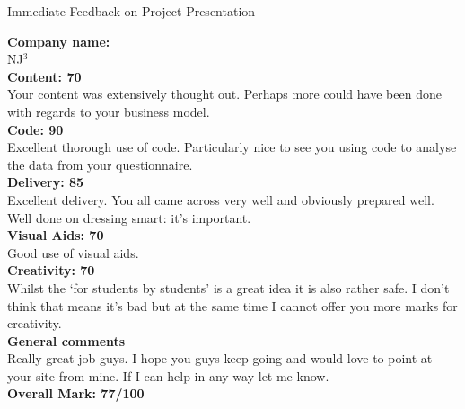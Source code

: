 \documentclass{article}
\begin{document}
\begin{center}
\Huge{Immediate Feedback on Project Presentation}\\
\end{center}


\normalsize
\textbf{Company name:}\\

NJ$^3$ \\

\textbf{Content: 70}\\

Your content was extensively thought out.
Perhaps more could have been done with regards to your business model.\\

\textbf{Code: 90}\\

Excellent thorough use of code.
Particularly nice to see you using code to analyse the data from your questionnaire.\\

\textbf{Delivery: 85}\\

Excellent delivery.
You all came across very well and obviously prepared well.
Well done on dressing smart: it's important.\\

\textbf{Visual Aids: 70}\\

Good use of visual aids.\\

\textbf{Creativity: 70}\\

Whilst the `for students by students' is a great idea it is also rather safe.
I don't think that means it's bad but at the same time I cannot offer you more marks for creativity.\\

\textbf{General comments}\\

Really great job guys.
I hope you guys keep going and would love to point at your site from mine.
If I can help in any way let me know.\\

\textbf{Overall Mark: 77/100}
\end{document}
